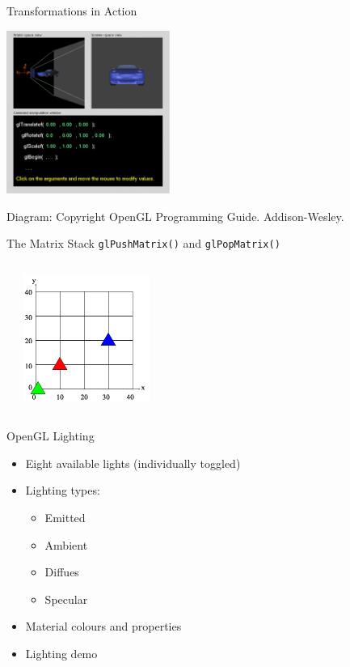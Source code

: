 \documentclass[aspectratio=1610,xcolor=dvipsnames,t]{beamer}
\newcommand{\showcode}[1]{\begin{mdframed}[style=code] %
                          \end{mdframed}%
}
\begin{document}
\begin{frame}{Transformations in Action}
   \begin{center} 
       \includegraphics[width=0.4\textwidth]{action} 
    \end{center} 
    \tiny
    Diagram: Copyright OpenGL Programming Guide. Addison-Wesley. 
    \normalsize
\end{frame} 

\begin{frame}{The Matrix Stack} 
    \texttt{glPushMatrix()} and \texttt{glPopMatrix()} 
    \begin{columns}[t]
        \showcode{matrixstack.c} 
        \begin{center}
            \includegraphics[width=0.5\textwidth]{stack} 
        \end{center} 
    \end{columns} 
\end{frame} 

\begin{frame}{OpenGL Lighting} 
    \begin{itemize} 
        \item Eight available lights (individually toggled)
        \item Lighting types:
        \begin{itemize} 
            \item Emitted
            \item Ambient
            \item Diffues
            \item Specular
        \end{itemize} 
        \item Material colours and properties
        \item Lighting demo
    \end{itemize} 
\end{frame} 
\end{document}

